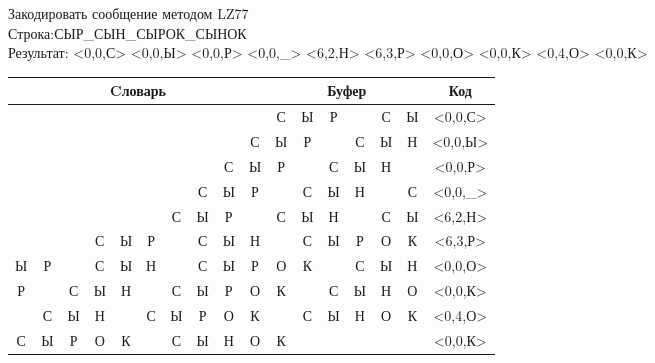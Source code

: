 \documentclass[a4paper, 12pt]{article}
\begin{document}
Закодировать сообщение методом LZ77\\
Строка:СЫР\_СЫН\_СЫРОК\_СЫНОК\\
Результат: <0,0,С> <0,0,Ы> <0,0,Р> <0,0,\_> <6,2,Н> <6,3,Р> <0,0,О> <0,0,К> <0,4,О> <0,0,К>\\
\begin{table}[h!]
\centering
\begin{tabular}{|c|c|c|c|c|c|c|c|c|c|c|c|c|c|c|c|c|} 
\hline
\multicolumn{10}{|c|}{Cловарь} & \multicolumn{6}{c|}{Буфер} & Код  \\ \hline
  &   &   &   &   &   &   &   &   &   & \cellcolor[HTML]{8CE4F6} С & Ы & Р &   & С & Ы & <0,0,С>
\\ \hline
  &   &   &   &   &   &   &   &   & С & \cellcolor[HTML]{8CE4F6} Ы & Р &   & С & Ы & Н & <0,0,Ы>
\\ \hline
  &   &   &   &   &   &   &   & С & Ы & \cellcolor[HTML]{8CE4F6} Р &   & С & Ы & Н &   & <0,0,Р>
\\ \hline
  &   &   &   &   &   &   & С & Ы & Р & \cellcolor[HTML]{8CE4F6}   & С & Ы & Н &   & С & <0,0,\_>
\\ \hline
  &   &   &   &   &   & \cellcolor[HTML]{FFFF00} С & \cellcolor[HTML]{FFFF00} Ы & Р &   & \cellcolor[HTML]{FFFF00} С & \cellcolor[HTML]{FFFF00} Ы & \cellcolor[HTML]{8CE4F6} Н &   & С & Ы & <6,2,Н>
\\ \hline
  &   &   & С & Ы & Р & \cellcolor[HTML]{FFFF00}   & \cellcolor[HTML]{FFFF00} С & \cellcolor[HTML]{FFFF00} Ы & Н & \cellcolor[HTML]{FFFF00}   & \cellcolor[HTML]{FFFF00} С & \cellcolor[HTML]{FFFF00} Ы & \cellcolor[HTML]{8CE4F6} Р & О & К & <6,3,Р>
\\ \hline
Ы & Р &   & С & Ы & Н &   & С & Ы & Р & \cellcolor[HTML]{8CE4F6} О & К &   & С & Ы & Н & <0,0,О>
\\ \hline
Р &   & С & Ы & Н &   & С & Ы & Р & О & \cellcolor[HTML]{8CE4F6} К &   & С & Ы & Н & О & <0,0,К>
\\ \hline
\cellcolor[HTML]{FFFF00}   & \cellcolor[HTML]{FFFF00} С & \cellcolor[HTML]{FFFF00} Ы & \cellcolor[HTML]{FFFF00} Н &   & С & Ы & Р & О & К & \cellcolor[HTML]{FFFF00}   & \cellcolor[HTML]{FFFF00} С & \cellcolor[HTML]{FFFF00} Ы & \cellcolor[HTML]{FFFF00} Н & \cellcolor[HTML]{8CE4F6} О & К & <0,4,О>
\\ \hline
С & Ы & Р & О & К &   & С & Ы & Н & О & \cellcolor[HTML]{8CE4F6} К &   &   &   &   &   & <0,0,К>
\\ \hline
\end{tabular}
\end{table}
\end{document}
